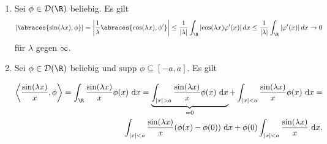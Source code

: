 \begin{solution}
\phantom{}
\begin{enumerate}[label = (\roman*)]
	\item Sei $\phi \in \mathcal{D}(\R)$ beliebig. Es gilt
	\begin{align*}
	\left|\abraces{\sin(\lambda x), \phi}\right| = \left|\frac{1}{\lambda}\abraces{\cos(\lambda x), \phi^\prime}\right| \leq \frac{1}{|\lambda|} \int_\R \left|\cos(\lambda x) \varphi^\prime(x)\right| dx \leq \frac{1}{|\lambda|} \int_\R \left|\varphi^\prime(x)\right| dx \rightarrow 0
	\end{align*}
	für $\lambda$ gegen $\infty$.
	\item Sei $\phi \in \mathcal{D}(\R)$ beliebig und $\text{supp~}\phi \subseteq [-a,a]$. Es gilt

\begin{align}
    \left\langle \frac{\sin(\lambda x)}{x}, \phi\right\rangle =
    \int_\R \frac{\sin(\lambda x)}{x} \phi(x) \text{~d}x=
    \underbrace{\int_{|x| > a} \frac{\sin(\lambda x)}{x} \phi(x) \text{~d}x}_{= 0} +
    \int_{|x| < a} \frac{\sin(\lambda x)}{x} \phi(x) \text{~d}x = \\
    \int_{|x| < a} \frac{\sin(\lambda x)}{x} (\phi(x) - \phi(0)) \text{~d}x + \phi(0) \int_{|x| < a} \frac{\sin(\lambda x)}{x} \text{~d}x.
\end{align}


\end{enumerate}
\end{solution}
